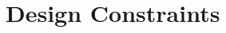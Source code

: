 \documentclass[a4paper,12pt,chapterprefix=false,bibliography=totoc,listof=totoc,]{scrreprt}
\begin{document}

\section{Design Constraints}

 
\end{document}
